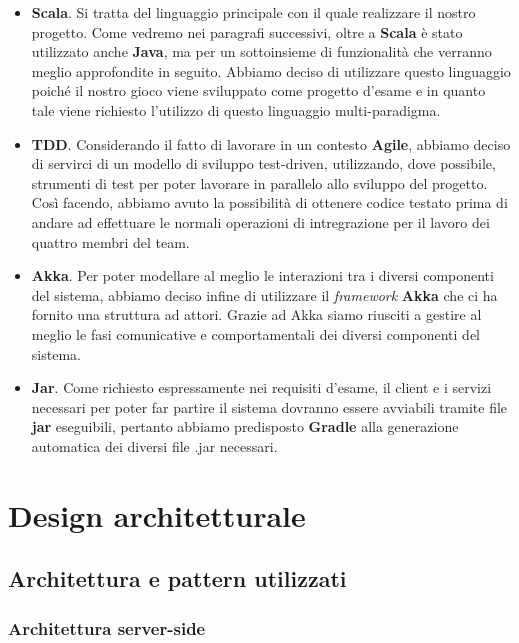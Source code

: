 	\begin{itemize}
	\item \textbf{Scala}. Si tratta del linguaggio principale con il quale realizzare il nostro progetto. Come vedremo nei paragrafi successivi, oltre a \textbf{Scala} è stato utilizzato anche \textbf{Java}, ma per un sottoinsieme di funzionalità che verranno meglio approfondite in seguito. Abbiamo deciso di utilizzare questo linguaggio poiché il nostro gioco viene sviluppato come progetto d'esame e in quanto tale viene richiesto l’utilizzo di questo linguaggio multi-paradigma.
	\item \textbf{TDD}. Considerando il fatto di lavorare in un contesto \textbf{Agile}, abbiamo deciso di servirci di un modello di sviluppo test-driven, utilizzando, dove possibile, strumenti di test per poter lavorare in parallelo allo sviluppo del progetto. Così facendo, abbiamo avuto la possibilità di ottenere codice testato prima di andare ad effettuare le normali operazioni di intregrazione per il lavoro dei quattro membri del team. 
	\item \textbf{Akka}. Per poter modellare al meglio le interazioni tra i diversi componenti del sistema, abbiamo deciso infine di utilizzare il \textit{framework} \textbf{Akka} che ci ha fornito una struttura ad attori. Grazie ad Akka siamo riusciti a gestire al meglio le fasi comunicative e comportamentali dei diversi componenti del sistema.  
	\item \textbf{Jar}. Come richiesto espressamente nei requisiti d'esame, il client e i servizi necessari per poter far partire il sistema dovranno essere avviabili tramite file \textbf{jar} eseguibili, pertanto abbiamo predisposto \textbf{Gradle} alla generazione automatica dei diversi file .jar necessari.
   \end{itemize}

   \clearpage
   
    \section{Design architetturale}\label{sec:design}
        \subsection[Architettura]{Architettura e pattern utilizzati}\label{subsec:architecture}
            \subsubsection{Architettura server-side}\label{subsub:architecture:server}
